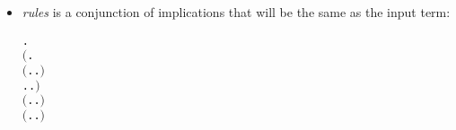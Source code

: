 \begin{itemize}
\item \emph{rules} is a conjunction of implications that will be the
    same as the input term:
\begin{alltt}
\HOLTokenTurnstile{} \HOLSymConst{\HOLTokenForall{}} .
       \ensuremath{(}\HOLSymConst{\HOLTokenForall{}}.
            \ensuremath{(}\HOLSymConst{\HOLTokenForall{}}.  \HOLTokenTransBegin{} \HOLTokenTransEnd {} \HOLSymConst{\HOLTokenImp{}} \HOLSymConst{\HOLTokenExists{}}.  \HOLTokenWeakTransBegin{} \HOLTokenWeakTransEnd {} \HOLSymConst{\HOLTokenConj{}}  \HOLSymConst{\HOLTokenWeakEQ} \ensuremath{)} \HOLSymConst{\HOLTokenConj{}}
            \HOLSymConst{\HOLTokenForall{}}.  \HOLTokenTransBegin{} \HOLTokenTransEnd {} \HOLSymConst{\HOLTokenImp{}} \HOLSymConst{\HOLTokenExists{}}.  \HOLTokenWeakTransBegin{} \HOLTokenWeakTransEnd {} \HOLSymConst{\HOLTokenConj{}}  \HOLSymConst{\HOLTokenWeakEQ} \ensuremath{)} \HOLSymConst{\HOLTokenConj{}}
       \ensuremath{(}\HOLSymConst{\HOLTokenForall{}}.  \HOLTokenTransBegin\HOLSymConst{\ensuremath{\tau}}\HOLTokenTransEnd {} \HOLSymConst{\HOLTokenImp{}} \HOLSymConst{\HOLTokenExists{}}.  \HOLSymConst{\HOLTokenEPS}  \HOLSymConst{\HOLTokenConj{}}  \HOLSymConst{\HOLTokenWeakEQ} \ensuremath{)} \HOLSymConst{\HOLTokenConj{}}
       \ensuremath{(}\HOLSymConst{\HOLTokenForall{}}.  \HOLTokenTransBegin\HOLSymConst{\ensuremath{\tau}}\HOLTokenTransEnd {} \HOLSymConst{\HOLTokenImp{}} \HOLSymConst{\HOLTokenExists{}}.  \HOLSymConst{\HOLTokenEPS}  \HOLSymConst{\HOLTokenConj{}}  \HOLSymConst{\HOLTokenWeakEQ} \ensuremath{)} \HOLSymConst{\HOLTokenImp{}}

\end{alltt}
\end{itemize}
